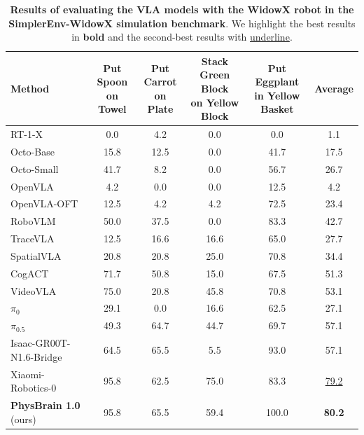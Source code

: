 \begin{table}[!t]
  \centering
  \caption{
    \textbf{Results of evaluating the VLA models with the WidowX robot in the SimplerEnv-WidowX simulation benchmark}. We highlight the best results in \textbf{bold} and the second-best results with \underline{underline}.
    }
  \begin{adjustbox}{width=\linewidth}
  \begin{tabular}{l c c c c c}
    \toprule
    \textbf{Method}
     & \makecell[c]{\textbf{Put Spoon} \\ \textbf{on Towel}} 
     & \makecell[c]{\textbf{Put Carrot} \\ \textbf{on Plate}} 
     & \makecell[c]{\textbf{Stack Green Block} \\ \textbf{on Yellow Block}} 
     & \makecell[c]{\textbf{Put Eggplant} \\ \textbf{in Yellow Basket}} 
     & \textbf{Average} \\
    \midrule

    RT-1-X~\citep{OXE_2024_ICRA}         &  0.0  & 4.2   & 0.0   & 0.0   & 1.1 \\
    Octo-Base~\citep{Octo_2024_arXiv}       & 15.8  & 12.5  & 0.0   & 41.7  & 17.5 \\
    Octo-Small~\citep{Octo_2024_arXiv}      & 41.7  & 8.2   & 0.0   & 56.7  & 26.7 \\
    OpenVLA~\citep{OpenVLA_2024_CoRL}         & 4.2   & 0.0   & 0.0   & 12.5   & 4.2 \\
    OpenVLA-OFT~\citep{OpenVLA-OFT_2025_arXiv}     & 12.5  & 4.2  & 4.2  & 72.5  & 23.4 \\
    RoboVLM~\citep{RoboVLM_2024_arXiv}         & 50.0  & 37.5  & 0.0   & 83.3  & 42.7 \\ 
    TraceVLA~\citep{TraceVLA_2025_arXiv}        & 12.5  & 16.6  & 16.6  & 65.0  & 27.7 \\
    SpatialVLA~\citep{Spatialvla_2025_arXiv}      & 20.8  & 20.8  & 25.0  & 70.8  & 34.4 \\
    CogACT~\citep{CogACT_2024_arXiv}          & 71.7 &  50.8  & 15.0 & 67.5 & 51.3 \\
    VideoVLA~\citep{VideoVLA_2025_NeurIPS}        & 75.0 & 20.8   & 45.8 & 70.8 & 53.1 \\
    $\pi_0$~\citep{PI0_2024_arXiv}         & 29.1 & 0.0 & 16.6 & 62.5 & 27.1 \\
    $\pi_{0.5}$~\citep{PI05_2025_arXiv} & 49.3 & 64.7 & 44.7 & 69.7 & 57.1 \\
    Isaac-GR00T-N1.6-Bridge~\citep{GR00T_N1.6}   & 64.5 & 65.5 & 5.5 & 93.0 & 57.1 \\
    Xiaomi-Robotics-0~\citep{XiaomiRobotics0_2026_arxiv} &  95.8 &  62.5 &  75.0 &  83.3 &  \underline{79.2} \\
    
    \cmidrule(lr){1-6}

    \rowcolor{gray!30}\textbf{PhysBrain 1.0} (ours) & 95.8 & 65.5 & 59.4 &  100.0  & \textbf{80.2} \\
    \bottomrule
  \end{tabular}
  \end{adjustbox}
  \vspace{0.5 em}
  \label{tab:simplerenv_widowx_results}
\end{table}

